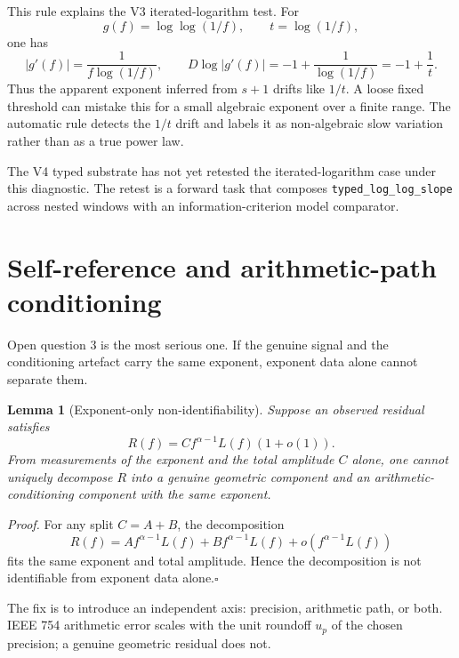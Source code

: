 \documentclass[11pt,a4paper]{article}
\newtheorem{lemma}[theorem]{Lemma}
\begin{document}
This rule explains the V3 iterated-logarithm test. For
\[
    g(f)=\log\log(1/f),
    \qquad t=\log(1/f),
\]
one has
\begin{equation}\label{eq:iterated-log-slope}
    |g'(f)|=\frac{1}{f\log(1/f)},
    \qquad
    D\log |g'(f)|=-1+\frac{1}{\log(1/f)}=-1+\frac{1}{t}.
\end{equation}
Thus the apparent exponent inferred from $s+1$ drifts like $1/t$. A loose fixed threshold can mistake this for a small algebraic exponent over a finite range. The automatic rule detects the $1/t$ drift and labels it as non-algebraic slow variation rather than as a true power law.

The V4 typed substrate has not yet retested the iterated-logarithm case under this diagnostic. The retest is a forward task that composes \texttt{typed\_log\_log\_slope} across nested windows with an information-criterion model comparator.

\section{Self-reference and arithmetic-path conditioning}\label{sec:self-reference}

Open question 3 is the most serious one. If the genuine signal and the conditioning artefact carry the same exponent, exponent data alone cannot separate them.

\begin{lemma}[Exponent-only non-identifiability]\label{lem:nonidentifiability}
Suppose an observed residual satisfies
\[
    R(f)=C f^{\alpha-1}L(f)(1+o(1)).
\]
From measurements of the exponent and the total amplitude $C$ alone, one cannot uniquely decompose $R$ into a genuine geometric component and an arithmetic-conditioning component with the same exponent.
\end{lemma}

\noindent\emph{Proof.}
For any split $C=A+B$, the decomposition
\[
    R(f)=A f^{\alpha-1}L(f)+B f^{\alpha-1}L(f)+o(f^{\alpha-1}L(f))
\]
fits the same exponent and total amplitude. Hence the decomposition is not identifiable from exponent data alone.\hfill$\square$

The fix is to introduce an independent axis: precision, arithmetic path, or both. IEEE 754 arithmetic error scales with the unit roundoff $u_p$ of the chosen precision; a genuine geometric residual does not.
\end{document}
